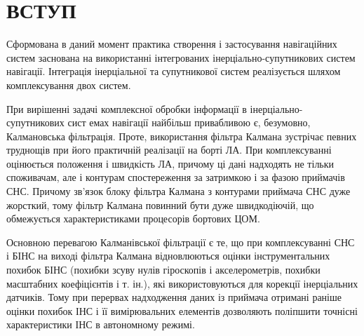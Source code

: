 \section*{ВСТУП}

Сформована в даний момент практика створення і застосування навігаційних 
систем заснована на використанні інтегрованих інерціально-супутникових 
систем навігації. Інтеграція  інерціальної та супутникової систем реалізується 
шляхом комплексування двох систем. 

При вирішенні задачі комплексної обробки інформації в інерціально-супутникових сист
емах навігації найбільш привабливою є, безумовно, Калмановська фільтрація. Проте, 
використання фільтра Калмана зустрічає певних труднощів при його практичній реалізації 
на борті ЛА. При комплексуванні оцінюється  положення і швидкість ЛА, причому ці дані 
надходять не тільки споживачам, але і контурам спостереження за затримкою  і за фазою  
приймачів СНС. Причому зв'язок блоку фільтра Калмана з контурами приймача СНС дуже жорсткий, 
тому фільтр Калмана повинний бути дуже швидкодіючій, що обмежується характеристиками 
процесорів бортових ЦОМ. 

Основною перевагою Калманівської фільтрації є те, що при комплексуванні СНС і БІНС на 
виході фільтра Калмана відновлюються  оцінки інструментальних похибок БІНС (похибки 
зсуву нулів гіроскопів і акселерометрів, похибки масштабних коефіцієнтів і т. ін.), 
які використовуються для корекції інерціальних датчиків. Тому при перервах надходження 
даних із приймача отримані раніше оцінки похибок ІНС і її вимірювальних елементів дозволяють 
поліпшити точнісні характеристики ІНС в автономному режимі. 

